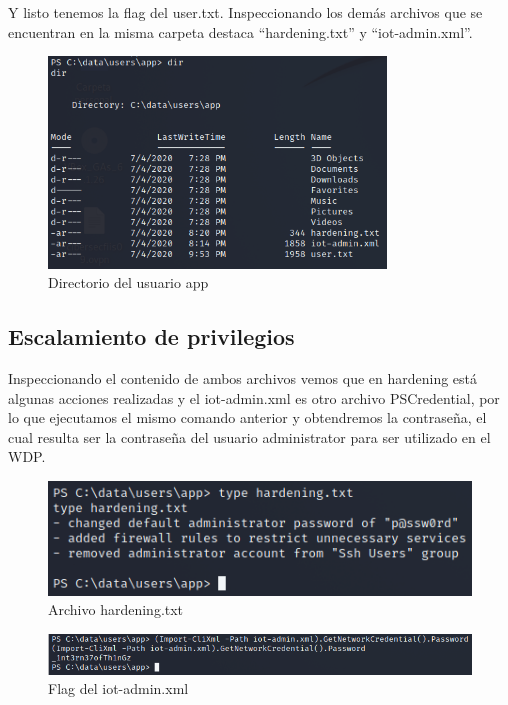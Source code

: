\documentclass{article}
\begin{document}
Y listo tenemos la flag del user.txt. Inspeccionando los demás archivos que se encuentran en la misma carpeta destaca “hardening.txt” y “iot-admin.xml”.
\begin{figure}[H]
	\center
	\includegraphics[width=0.8\textwidth]{images/omni/25.png}
	\caption{Directorio del usuario app}
\end{figure}

\subsection{Escalamiento de privilegios}

Inspeccionando el contenido de ambos archivos vemos que en hardening está algunas acciones realizadas y el iot-admin.xml es otro archivo PSCredential, por lo que ejecutamos el mismo comando anterior y obtendremos la contraseña, el cual resulta ser la contraseña del usuario administrator para ser utilizado en el WDP.
\begin{figure}[H]
	\center
	\includegraphics[width=\textwidth]{images/omni/26.png}
	\caption{Archivo hardening.txt}
\end{figure}
\begin{figure}[H]
	\center
	\includegraphics[width=\textwidth]{images/omni/27.png}
	\caption{Flag del iot-admin.xml}
\end{figure}
\end{document}
